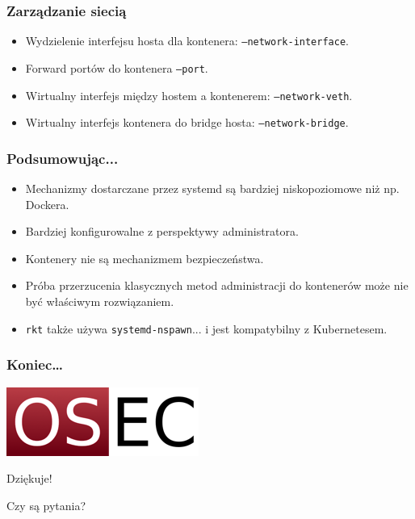 \documentclass[dvipsnames,table]{beamer}
\begin{document}
\begin{frame}
\frametitle{Zarządzanie siecią}
\begin{itemize}
	\item Wydzielenie interfejsu hosta dla kontenera: {\tt --network-interface}.
	\item Forward portów do kontenera {\tt --port}.
	\item Wirtualny interfejs między hostem a kontenerem: {\tt --network-veth}.
	\item Wirtualny interfejs kontenera do bridge hosta: {\tt --network-bridge}.
\end{itemize}
\end{frame}

\begin{frame}
\frametitle{Podsumowując...}
\begin{itemize}
	\item Mechanizmy dostarczane przez systemd są bardziej niskopoziomowe niż np. Dockera.
	\item Bardziej konfigurowalne z perspektywy administratora.
	\item Kontenery nie są mechanizmem bezpieczeństwa.
	\item Próba przerzucenia klasycznych metod administracji do kontenerów może nie być właściwym rozwiązaniem.
	\item {\tt rkt} także używa {\tt systemd-nspawn}... i jest kompatybilny z Kubernetesem.
\end{itemize}	
\end{frame}

\begin{frame}
\frametitle{Koniec\ldots}
\begin{center}
\includegraphics[scale=0.5]{img-oseclogo.png}

Dziękuje!

Czy są pytania?

\end{center}
\end{frame}
\end{document}
